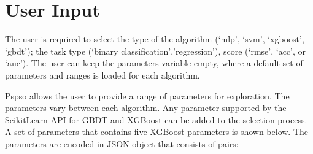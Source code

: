 \documentclass[letterpaper,10pt,english]{sphinxmanual}
\begin{document}
\section{User Input}
\label{\detokenize{index:user-input}}
The user is required to select the type of the algorithm (‘mlp’, ‘svm’, ‘xgboost’, ‘gbdt’); the task type (‘binary classification’,’regression’), score (‘rmse’, ‘acc’, or ‘auc’). The user can keep the parameters variable empty, where a default set of parameters and ranges is loaded
for each algorithm.

\begin{sphinxVerbatim}[commandchars=\\\{\}]
   
\end{sphinxVerbatim}

Pspso allows the user to provide a range of parameters for exploration.
The parameters vary between each algorithm. Any parameter supported by the Scikit\sphinxhyphen{}Learn API for GBDT and XGBoost can be added to the selection process.
A set of parameters that contains five XGBoost parameters is shown below. The parameters are encoded in JSON object that consists of  pairs:

\begin{sphinxVerbatim}[commandchars=\\\{\}]
  \PYG{p}{[}\PYG{p}{]}
                  \PYG{p}{[}\PYG{p}{]}
                 \PYG{p}{[}\PYG{p}{]}
                 \PYG{p}{[}\PYG{p}{]}
                 \PYG{p}{[}\PYG{p}{]}
\end{sphinxVerbatim}
\end{document}
